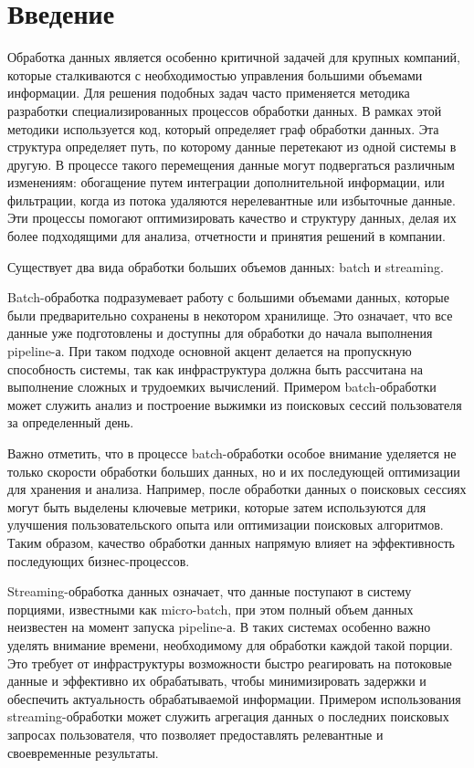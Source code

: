 \section{Введение}
\label{sec:intro}

Обработка данных является особенно критичной задачей для крупных компаний, которые сталкиваются с необходимостью управления большими объемами информации. Для решения подобных задач часто применяется методика разработки специализированных процессов обработки данных. В рамках этой методики используется код, который определяет граф обработки данных. Эта структура определяет путь, по которому данные перетекают из одной системы в другую. В процессе такого перемещения данные могут подвергаться различным изменениям: обогащение путем интеграции дополнительной информации, или фильтрации, когда из потока удаляются нерелевантные или избыточные данные. Эти процессы помогают оптимизировать качество и структуру данных, делая их более подходящими для анализа, отчетности и принятия решений в компании.

Существует два вида обработки больших объемов данных: batch и streaming.

Batch-обработка подразумевает работу с большими объемами данных, которые были предварительно сохранены в некотором хранилище. Это означает, что все данные уже подготовлены и доступны для обработки до начала выполнения pipeline-а. При таком подходе основной акцент делается на пропускную способность системы, так как инфраструктура должна быть рассчитана на выполнение сложных и трудоемких вычислений. Примером batch-обработки может служить анализ и построение выжимки из поисковых сессий пользователя за определенный день.

Важно отметить, что в процессе batch-обработки особое внимание уделяется не только скорости обработки больших данных, но и их последующей оптимизации для хранения и анализа. Например, после обработки данных о поисковых сессиях могут быть выделены ключевые метрики, которые затем используются для улучшения пользовательского опыта или оптимизации поисковых алгоритмов. Таким образом, качество обработки данных напрямую влияет на эффективность последующих бизнес-процессов.

Streaming-обработка данных означает, что данные поступают в систему порциями, известными как micro-batch, при этом полный объем данных неизвестен на момент запуска pipeline-а. В таких системах особенно важно уделять внимание времени, необходимому для обработки каждой такой порции. Это требует от инфраструктуры возможности быстро реагировать на потоковые данные и эффективно их обрабатывать, чтобы минимизировать задержки и обеспечить актуальность обрабатываемой информации. Примером использования streaming-обработки может служить агрегация данных о последних поисковых запросах пользователя, что позволяет предоставлять релевантные и своевременные результаты.

